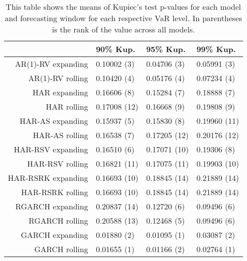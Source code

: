 \begin{table}[ht]
\centering
\begin{tabular}{rlll}
  \hline
 & 90\% Kup. & 95\% Kup. & 99\% Kup. \\ 
  \hline
AR(1)-RV expanding & 0.10002 (3) & 0.04706 (3) & 0.05991 (3) \\ 
  AR(1)-RV rolling & 0.10420 (4) & 0.05176 (4) & 0.07234 (4) \\ 
  HAR expanding & 0.16606 (8) & 0.15284 (7) & 0.18888 (7) \\ 
  HAR rolling & 0.17008 (12) & 0.16668 (9) & 0.19808 (9) \\ 
  HAR-AS expanding & 0.15937 (5) & 0.15830 (8) & 0.19960 (11) \\ 
  HAR-AS rolling & 0.16538 (7) & 0.17205 (12) & 0.20176 (12) \\ 
  HAR-RSV expanding & 0.16510 (6) & 0.17071 (10) & 0.19306 (8) \\ 
  HAR-RSV rolling & 0.16821 (11) & 0.17075 (11) & 0.19903 (10) \\ 
  HAR-RSRK expanding & 0.16693 (10) & 0.18845 (14) & 0.21889 (14) \\ 
  HAR-RSRK rolling & 0.16693 (10) & 0.18845 (14) & 0.21889 (14) \\ 
  RGARCH expanding & 0.20837 (14) & 0.12720 (6) & 0.09496 (6) \\ 
  RGARCH rolling & 0.20588 (13) & 0.12468 (5) & 0.09496 (6) \\ 
  GARCH expanding & 0.01880 (2) & 0.01095 (1) & 0.03087 (2) \\ 
  GARCH rolling & 0.01655 (1) & 0.01166 (2) & 0.02764 (1) \\ 
   \hline
\end{tabular}
\caption[Kupiec's test means]{This table shows the means of Kupiec's test p-values for each model and forecasting window for each respective VaR level. In parentheses is the rank of the value across all models. } 
\label{Table:VaR_means_Kupiec}
\end{table}
